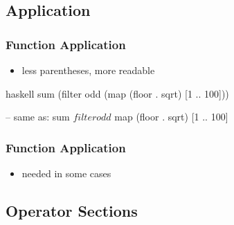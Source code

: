 \documentclass[dvipsnames]{beamer}
\theoremstyle{plain}
\begin{document}
\subsection{Application}

\begin{frame}[fragile]
  \frametitle{Function Application}


  \begin{itemize}
    \item less parentheses, more readable
  \end{itemize}

  \begin{exampleblock}{}
    \begin{pygments}{haskell}
sum (filter odd (map (floor . sqrt) [1 .. 100]))

-- same as:
sum $ filter odd $ map (floor . sqrt) [1 .. 100]
    \end{pygments}
  \end{exampleblock}
\end{frame}

\begin{frame}[fragile]
  \frametitle{Function Application}

  \begin{itemize}
    \item needed in some cases
  \end{itemize}

  \begin{exampleblock}{}
  \end{exampleblock}
\end{frame}

\subsection{Operator Sections}
\end{document}
